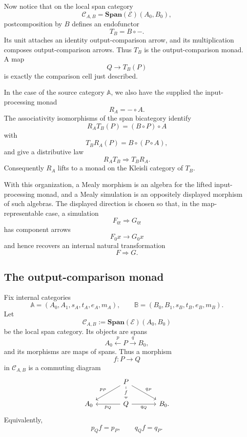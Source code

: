 Now notice that on the local span category
\[
    \mathcal C_{A,B}=\mathbf{Span}(\mathcal E)(A_0,B_0),
\]
postcomposition by \(B\) defines an endofunctor
\[
    T_B=B\circ-.
\]
Its unit attaches an identity output-comparison arrow, and its multiplication composes output-comparison arrows. Thus \(T_B\) is the output-comparison monad.
A map
\[
    Q\to T_B(P)
\]
is exactly the comparison cell just described.

In the case of the source category \(\mathbb A\), we also have the supplied the input-processing monad
\[
    R_A=-\circ A.
\]
The associativity isomorphisms of the span bicategory identify
\[
    R_AT_B(P)=(B\circ P)\circ A
\]
with
\[
    T_BR_A(P)=B\circ(P\circ A),
\]
and give a distributive law
\[
    R_AT_B\Rightarrow T_BR_A.
\]
Consequently \(R_A\) lifts to a monad on the Kleisli category of \(T_B\).

With this organization, a Mealy morphism is an algebra for the lifted input-processing monad, and a Mealy simulation is an oppositely displayed morphism of such algebras. The displayed direction is chosen so that, in the map-representable case, a simulation
\[
    F_{0!}\Rightarrow G_{0!}
\]
has component arrows
\[
    F_0x\to G_0x
\]
and hence recovers an internal natural transformation
\[
    F\Rightarrow G.
\]

\subsection{The output-comparison monad}
\label{subsec:output-comparison-monad}

Fix internal categories
\[
    \mathbb A=(A_0,A_1,s_A,t_A,e_A,m_A),
    \qquad
    \mathbb B=(B_0,B_1,s_B,t_B,e_B,m_B).
\]
Let
\[
    \mathcal C_{A,B}:=\mathbf{Span}(\mathcal E)(A_0,B_0)
\]
be the local span category. Its objects are spans
\[
    A_0\xleftarrow{p}P\xrightarrow{q}B_0,
\]
and its morphisms are maps of spans. Thus a morphism
\[
    f:P\to Q
\]
in \(\mathcal C_{A,B}\) is a commuting diagram
\[
    \begin{tikzcd}[column sep=large]
        & 
            P 
                \arrow[d, "f" description] 
                \arrow[dl, "p_P"'] 
                \arrow[dr, "q_P"] 
        & 
        \\
            A_0 
        & 
            Q 
                \arrow[l, "p_Q"] 
                \arrow[r, "q_Q"'] 
        & 
            B_0.
    \end{tikzcd}
\]
Equivalently,
\[
    p_Qf=p_P,
    \qquad
    q_Qf=q_P.
\]

